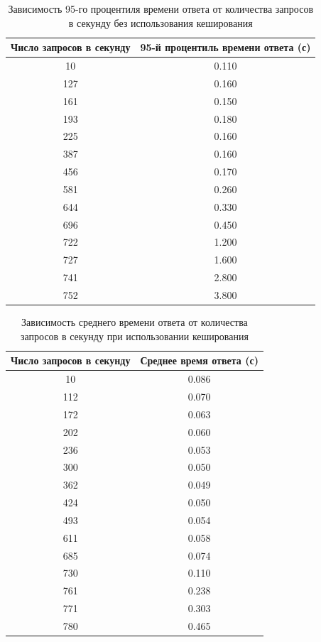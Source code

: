 \begin{table}[H]
\centering
\caption{Зависимость 95-го процентиля времени ответа от количества запросов в секунду без использования кеширования}
\begin{tabular}{|c|c|}
\hline
    \textbf{Число запросов в секунду} & \textbf{95-й процентиль времени ответа (с)} \\ \hline
     10 & 0.110 \\ \hline             
    127 & 0.160 \\ \hline             
    161 & 0.150 \\ \hline             
    193 & 0.180 \\ \hline             
    225 & 0.160 \\ \hline             
    387 & 0.160 \\ \hline             
    456 & 0.170 \\ \hline             
    581 & 0.260 \\ \hline             
    644 & 0.330 \\ \hline             
    696 & 0.450 \\ \hline             
    722 & 1.200 \\ \hline             
    727 & 1.600 \\ \hline             
    741 & 2.800 \\ \hline             
    752 & 3.800 \\ \hline             
\end{tabular}
\label{tab:nocache:95}
\end{table}

\begin{table}[H]
\centering
\caption{Зависимость среднего времени ответа от количества запросов в секунду при использовании кеширования}
\begin{tabular}{|c|c|}
\hline
    \textbf{Число запросов в секунду} & \textbf{Среднее время ответа (с)} \\ \hline
     10 & 0.086 \\ \hline
    112 & 0.070 \\ \hline
    172 & 0.063 \\ \hline
    202 & 0.060 \\ \hline
    236 & 0.053 \\ \hline
    300 & 0.050 \\ \hline
    362 & 0.049 \\ \hline
    424 & 0.050 \\ \hline
    493 & 0.054 \\ \hline
    611 & 0.058 \\ \hline
    685 & 0.074 \\ \hline
    730 & 0.110 \\ \hline
    761 & 0.238 \\ \hline
    771 & 0.303 \\ \hline
    780 & 0.465 \\ \hline
\end{tabular}
\label{tab:cache:avg}
\end{table}

